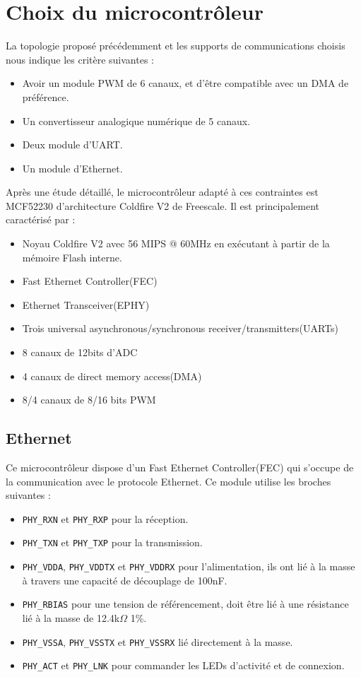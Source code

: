 \documentclass[11pt, a4paper, twoside]{book}
\begin{document}
{\section{Choix du microcontrôleur}
La topologie proposé précédemment et les supports de communications choisis nous indique les critère suivantes :
\begin{itemize}
\item Avoir un module PWM de 6 canaux, et d'être compatible avec un DMA de préférence.
\item Un convertisseur analogique numérique de 5 canaux.
\item Deux module d'UART.
\item Un module d'Ethernet.
\end{itemize}
Après une étude détaillé, le microcontrôleur adapté à ces contraintes est MCF52230 d'architecture Coldfire V2 de Freescale. Il est principalement caractérisé par :
\begin{itemize}
\item Noyau Coldfire V2 avec 56 MIPS @ 60MHz en exécutant à partir de la mémoire Flash interne.
\item Fast Ethernet Controller(FEC)
\item Ethernet Transceiver(EPHY)
\item Trois universal asynchronous/synchronous receiver/transmitters(UARTs)
\item 8 canaux de 12bits d'ADC
\item 4 canaux de direct memory access(DMA)
\item 8/4 canaux de 8/16 bits PWM
\end{itemize}
\subsection{Ethernet}
Ce microcontrôleur dispose d'un Fast Ethernet Controller(FEC) qui s'occupe de la communication avec le protocole Ethernet. Ce module utilise les broches suivantes :
\begin{itemize}
\item \texttt{PHY\_RXN} et \texttt{PHY\_RXP} pour la réception.
\item \texttt{PHY\_TXN} et \texttt{PHY\_TXP} pour la transmission.
\item \texttt{PHY\_VDDA}, \texttt{PHY\_VDDTX} et \texttt{PHY\_VDDRX} pour l'alimentation, ils ont lié à la masse à travers une capacité de découplage de 100nF.
\item \texttt{PHY\_RBIAS} pour une tension de référencement, doit être lié à une résistance lié à la masse de 12.4k$\Omega$ 1\%.
\item \texttt{PHY\_VSSA}, \texttt{PHY\_VSSTX} et \texttt{PHY\_VSSRX} lié directement à la masse.
\item \texttt{PHY\_ACT} et \texttt{PHY\_LNK} pour commander les LEDs d'activité et de connexion.
\end{itemize}

}
\end{document}
